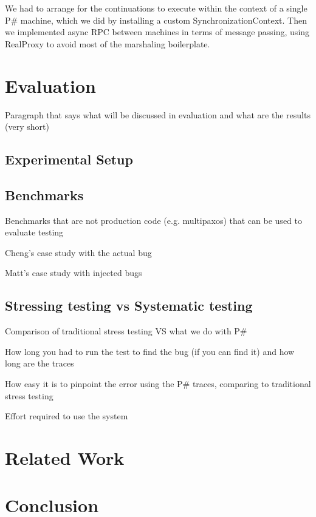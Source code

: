 \documentclass{sig-alternate}
\newcommand{\psharp}{P\#\xspace}
\begin{document}
We had to arrange for the continuations to execute within the context of a single \psharp machine, which we did by installing a custom SynchronizationContext.  Then we implemented async RPC between machines in terms of message passing, using RealProxy to avoid most of the marshaling boilerplate.

\section{Evaluation}
\label{sec:eval}

Paragraph that says what will be discussed in evaluation and what are the results (very short)

\subsection{Experimental Setup}

\subsection{Benchmarks}

Benchmarks that are not production code (e.g. multipaxos) that can be used to evaluate testing

Cheng's case study with the actual bug

Matt's case study with injected bugs

\subsection{Stressing testing vs Systematic testing}

Comparison of traditional stress testing VS what we do with \psharp

How long you had to run the test to find the bug (if you can find it) and how long are the traces

How easy it is to pinpoint the error using the \psharp traces, comparing to traditional stress testing

Effort required to use the system

\section{Related Work}
\label{sec:rw}



\section{Conclusion}
\label{sec:concl}
\end{document}
